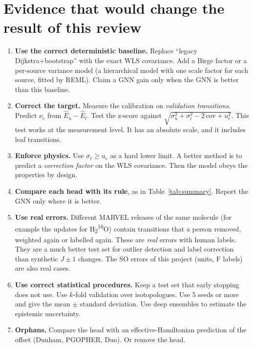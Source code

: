 \documentclass[11pt,a4paper]{article}
\begin{document}
\section{Evidence that would change the result of this review}

\begin{enumerate}
\item \textbf{Use the correct deterministic baseline.} Replace ``legacy
  Dijkstra+bootstrap'' with the exact WLS covariance. Add a Birge factor or a
  per-source variance model (a hierarchical model with one scale factor for each
  source, fitted by REML). Claim a GNN gain only when the GNN is better than this
  baseline.
\item \textbf{Correct the target.} Measure the calibration on \emph{validation
  transitions}. Predict $\nu_e$ from $\hat E_u - \hat E_l$. Test the z-score against
  $\sqrt{\sigma_u^2 + \sigma_l^2 - 2\,\mathrm{cov} + u_e^2}$. This test works at the
  measurement level. It has an absolute scale, and it includes leaf transitions.
\item \textbf{Enforce physics.} Use $\sigma_\ell \ge u_e$ as a hard lower limit. A
  better method is to predict a \emph{correction factor} on the WLS covariance. Then
  the model obeys the properties by design.
\item \textbf{Compare each head with its rule}, as in Table~\ref{tab:summary}. Report
  the GNN only where it is better.
\item \textbf{Use real errors.} Different MARVEL releases of the same molecule (for
  example the updates for H\textsubscript{2}\textsuperscript{16}O) contain transitions
  that a person removed, weighted again or labelled again. These are \emph{real}
  errors with human labels. They are a much better test set for outlier detection and
  label correction than synthetic $J\pm1$ changes. The SO errors of this project
  (units, F labels) are also real cases.
\item \textbf{Use correct statistical procedures.} Keep a test set that early
  stopping does not use. Use $k$-fold validation over isotopologues. Use 5 seeds or
  more and give the mean $\pm$ standard deviation. Use deep ensembles to estimate the
  epistemic uncertainty.
\item \textbf{Orphans.} Compare the head with an effective-Hamiltonian prediction of
  the offset (Dunham, PGOPHER, Duo). Or remove the head.
\end{enumerate}
\end{document}
